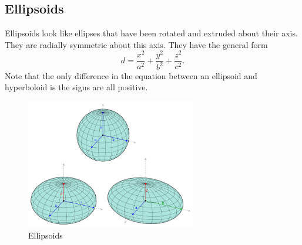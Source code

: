 \subsection{Ellipsoids}
\noindent
Ellipsoids look like ellipses that have been rotated and extruded about their axis.
They are radially symmetric about this axis.
They have the general form 
\begin{equation*}
	d = \frac{x^2}{a^2} + \frac{y^2}{b^2} + \frac{z^2}{c^2}.
\end{equation*}
Note that the only difference in the equation between an ellipsoid and hyperboloid is the signs are all positive.

\begin{figure}[H]
	\centering
	\includegraphics[width=0.66\textwidth]{./differentialMultivariableCalculus/ellipsoids.png}
	\caption{Ellipsoids}
\end{figure}
